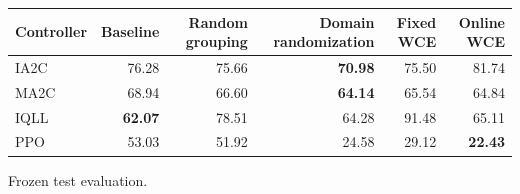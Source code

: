 \begin{tabular}{lrrrrr}
\hline
Controller & Baseline & Random grouping & Domain randomization & Fixed WCE & Online WCE \\
\hline
IA2C & 76.28 & 75.66 & \textbf{70.98} & 75.50 & 81.74 \\
MA2C & 68.94 & 66.60 & \textbf{64.14} & 65.54 & 64.84 \\
IQLL & \textbf{62.07} & 78.51 & 64.28 & 91.48 & 65.11 \\
PPO & 53.03 & 51.92 & 24.58 & 29.12 & \textbf{22.43} \\
\hline
\end{tabular}
Frozen test evaluation.
